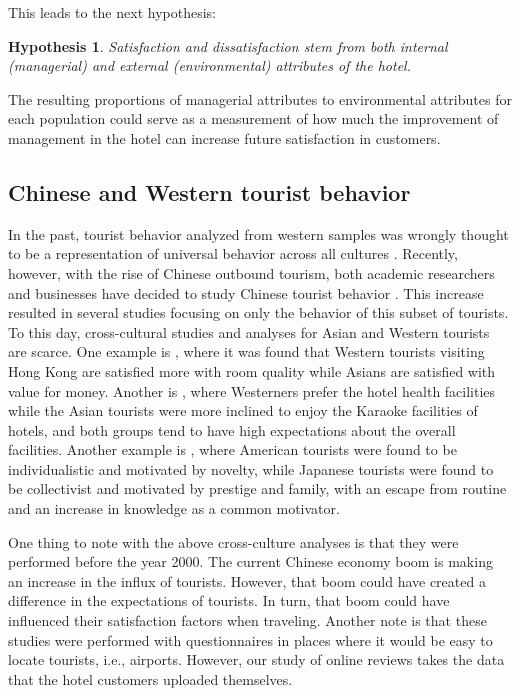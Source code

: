 \documentclass[smallextended,natbib]{svjour3}       %
\newtheorem{hyp}{Hypothesis}
\begin{document}
    This leads to the next hypothesis:

    \begin{hyp}
    \label{hyp:man_env}
    Satisfaction and dissatisfaction stem from both internal (managerial) and external (environmental) attributes of the hotel.
    \end{hyp}

    The resulting proportions of managerial attributes to environmental attributes for each population could serve as a measurement of how much the improvement of management in the hotel can increase future satisfaction in customers.

  \subsection{Chinese and Western tourist behavior}\label{theory_zh_en}

    In the past, tourist behavior analyzed from western samples was wrongly thought to be a representation of universal behavior across all cultures \cite[][]{nielsen2017, jones2010WEIRD, guaratne2009, hogan1978biases}. Recently, however, with the rise of Chinese outbound tourism, both academic researchers and businesses have decided to study Chinese tourist behavior \cite[][]{sun2017}. This increase resulted in several studies focusing on only the behavior of this subset of tourists. To this day, cross-cultural studies and analyses for Asian and Western tourists are scarce. One example is \cite{choi2000}, where it was found that Western tourists visiting Hong Kong are satisfied more with room quality while Asians are satisfied with value for money. Another is  \cite{bauer1993changing}, where Westerners prefer the hotel health facilities while the Asian tourists were more inclined to enjoy the Karaoke facilities of hotels, and both groups tend to have high expectations about the overall facilities. Another example is \cite{kim2000}, where American tourists were found to be individualistic and motivated by novelty, while Japanese tourists were found to be collectivist and motivated by prestige and family, with an escape from routine and an increase in knowledge as a common motivator. 

    One thing to note with the above cross-culture analyses is that they were performed before the year 2000. The current Chinese economy boom is making an increase in the influx of tourists. However, that boom could have created a difference in the expectations of tourists. In turn, that boom could have influenced their satisfaction factors when traveling. Another note is that these studies were performed with questionnaires in places where it would be easy to locate tourists, i.e., airports. However, our study of online reviews takes the data that the hotel customers uploaded themselves.
\end{document}
